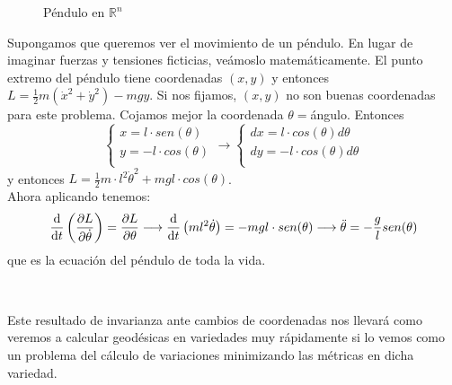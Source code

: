 \documentclass[palatino, bibnumbers]{apuntes}
\begin{document}
\begin{example}
	\begin{figure}
		\begin{center}
		\end{center}
		\caption{Péndulo en $ℝ^n$}
	\end{figure}
	
	Supongamos que queremos ver el movimiento de un péndulo. En lugar de imaginar fuerzas y tensiones ficticias, veámoslo matemáticamente. El punto extremo del péndulo tiene coordenadas $(x,y)$ y entonces $L=\frac{1}{2}m(\dot{x}^2+\dot{y}^2)-mgy$. Si nos fijamos, $(x,y)$ no son buenas coordenadas para este problema. Cojamos mejor la coordenada $\theta=$ángulo. Entonces$$ \begin{cases}
		x=l\cdot sen(\theta)\\
		y=-l\cdot cos(\theta)\\
	\end{cases}\longrightarrow \begin{cases}
	dx=l\cdot cos(\theta)d\theta\\
	dy=-l\cdot cos(\theta)d\theta\\
	\end{cases}$$
	y entonces $L=\frac{1}{2}m\cdot l^2\dot{\theta}^2+mgl\cdot cos(\theta)$. \\Ahora aplicando  tenemos:
	$$\dv{t}\left(\pdv{L}{\dot{\theta}}\right)=\pdv{L}{\theta}\longrightarrow\dv{t}\left(ml^2\dot{\theta}\right)=-mgl\cdot sen(\theta)\longrightarrow\ddot{\theta}=-\frac{g}{l}sen(\theta)$$
	que es la ecuación del péndulo de toda la vida.
\end{example}
\\
\begin{obs}
	Este resultado de invarianza ante cambios de coordenadas  nos llevará como veremos a calcular geodésicas en variedades muy rápidamente si lo vemos como un problema del cálculo de variaciones minimizando las métricas en dicha variedad.
\end{obs}
\end{document}
